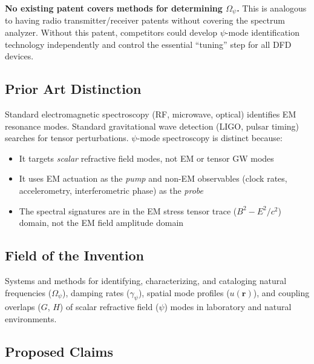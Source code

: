 \documentclass[12pt,letterpaper]{article}
\begin{document}
\textbf{No existing patent covers methods for determining $\Omega_\psi$.}
This is analogous to having radio transmitter/receiver patents without
covering the spectrum analyzer. Without this patent, competitors could
develop $\psi$-mode identification technology independently and control
the essential ``tuning'' step for all DFD devices.

\subsection{Prior Art Distinction}

Standard electromagnetic spectroscopy (RF, microwave, optical) identifies
EM resonance modes. Standard gravitational wave detection (LIGO, pulsar
timing) searches for tensor perturbations. $\psi$-mode spectroscopy is
distinct because:
\begin{itemize}
\item It targets \emph{scalar} refractive field modes, not EM or tensor GW modes
\item It uses EM actuation as the \emph{pump} and non-EM observables
(clock rates, accelerometry, interferometric phase) as the \emph{probe}
\item The spectral signatures are in the EM stress tensor trace
($B^2 - E^2/c^2$) domain, not the EM field amplitude domain
\end{itemize}

\subsection{Field of the Invention}

Systems and methods for identifying, characterizing, and cataloging
natural frequencies ($\Omega_\psi$), damping rates ($\gamma_\psi$),
spatial mode profiles ($u(\mathbf{r})$), and coupling overlaps ($G$, $H$)
of scalar refractive field ($\psi$) modes in laboratory and natural
environments.

\subsection{Proposed Claims}
\end{document}
